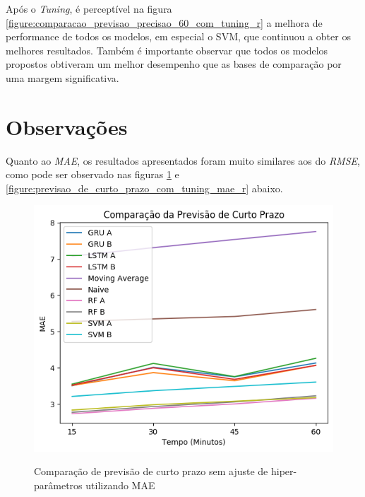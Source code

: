 Após o \textit{Tuning}, é perceptível na figura \ref{figure:comparacao_previsao_precisao_60_com_tuning_r} a melhora de performance de todos os modelos, em especial o \acrshort{SVM}, que continuou a obter os melhores resultados. Também é importante observar que todos os modelos propostos obtiveram um melhor desempenho que as bases de comparação por uma margem significativa.

\section{Observações}

Quanto ao \textit{\acrshort{MAE}}, os resultados apresentados foram muito similares aos do \textit{\acrshort{RMSE}}, como pode ser observado nas figuras \ref{figure:previsao_de_curto_prazo_mae_r} e \ref{figure:previsao_de_curto_prazo_com_tuning_mae_r} abaixo.

\begin{figure}[H]
    \centering
    \includegraphics[scale=0.8]{monography/img/comparisons/comparacao_da_previsao_de_curto_prazo_mae.png}
    \label{figure:previsao_de_curto_prazo_mae_r}
    \caption{Comparação de previsão de curto prazo sem ajuste de hiper-parâmetros utilizando MAE}
\end{figure}


